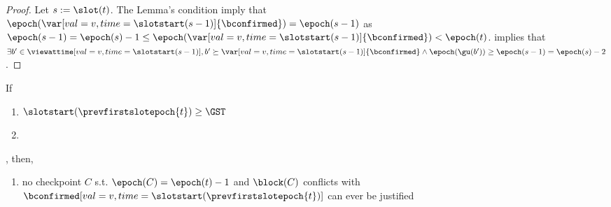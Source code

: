 \documentclass{article}
\begin{document}
\begin{proof}
    Let $s:= \slot(t)$.
    The Lemma's condition imply that $\epoch(\var[val=v,time=\slotstart(s-1)]{\bconfirmed}) = \epoch(s-1)$ as $\epoch(s-1) = \epoch(s)-1 \leq \epoch(\var[val=v,time=\slotstart(s-1)]{\bconfirmed}) < \epoch(t)$.
     implies that $\exists b' \in \viewattime[val=v,time=\slotstart(s-1)], b' \succeq \var[val=v,time=\slotstart(s-1)]{\bconfirmed} \land \epoch(\gu(b')) \geq \epoch(s-1) = \epoch(s)-2$.
\end{proof}


\begin{lemma}\label{lem:no-conflicting-e-1-chkp-if-reconfirmed}
    If
    \begin{enumerate}
        \item $\slotstart(\prevfirstslotepoch{t}) \geq \GST$
        \item \label{itm:lem:no-conflicting-e-1-chkp-if-reconfirmed:2} 
    \end{enumerate},
    then,
    \begin{enumerate}
        \item no checkpoint $C$ s.t. $\epoch(C) = \epoch(t)-1$ and $\block(C)$ conflicts with  $\bconfirmed[val=v,time=\slotstart(\prevfirstslotepoch{t})]$ can ever be justified
    \end{enumerate}
\end{lemma}
\end{document}
